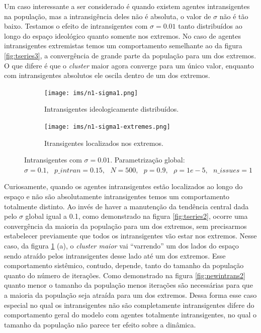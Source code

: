   Um caso interessante a ser considerado é quando existem agentes intransigentes
  na população, mas a intransigência deles não é absoluta, o valor de \(\sigma\) não
  é tão baixo. Testamos o efeito de intransigentes com \(\sigma = 0.01\) tanto
  distribuídos ao longo do espaço ideológico quanto somente nos extremos. No
  caso de agentes intransigentes extremistas temos um comportamento semelhante
  ao da figura \ref{fig:tseries3}, a convergência de grande parte da população
  para um dos extremos. O que difere é que o \textit{cluster} maior agora
  converge para um único valor, enquanto com intransigentes absolutos ele oscila
  dentro de um dos extremos.

    \begin{figure}[H]
    \centering
    \begin{subfigure}[b]{0.49\textwidth}
      \texttt{[image: ims/n1-sigma1.png]}
      \caption{Intransigentes ideologicamente distribuídos.}
    \end{subfigure}
    \begin{subfigure}[b]{0.49\textwidth}
      \texttt{[image: ims/n1-sigma1-extremes.png]}
       \caption{Itransigentes localizados nos extremos.}
     \end{subfigure}

     \caption{ Intransigentes com \(\sigma = 0.01\). Parametrização global: \( \sigma =
       0.1, \text{ } p\_intran = 0.15, \text{ } N = 500, \text{ } p = 0.9,
       \text{ } \rho = 1e-5, \text{ } n\_issues = 1 \)}
    \label{fig:newintrans}
     \end{figure}
  
     Curiosamente, quando os agentes intransigentes estão localizados ao longo
     do espaço e não são absolutamente intransigentes temos um comportamento
     totalmente distinto. Ao invés de haver a manutenção da tendência central
     dada pelo \(\sigma\) global igual a 0.1, como demonstrado na figura
     \ref{fig:tseries2}, ocorre uma convergência da maioria da população para um
     dos extremos, sem precisarmos estabelecer previamente que todos os
     intransigentes vão estar nos extremos. Nesse caso, da figura
     \ref{fig:newintrans} (a), o \textit{cluster maior} vai ``varrendo'' um dos
     lados do espaço sendo atraído pelos intransigentes desse lado até um dos
     extremos. Esse comportamento sistêmico, contudo, depende, tanto do tamanho
     da população quanto do número de iterações.  Como demonstrado na figura
     \ref{fig:newintrans2} quanto menor o tamanho da população menos iterações
     são necessárias para que a maioria da população seja atraída para um dos
     extremos. Dessa forma esse caso especial no qual os intransigentes não são
     completamente intransigentes difere do comportamento geral do modelo com
     agentes totalmente intransigentes, no qual o tamanho da população não
     parece ter efeito sobre a dinâmica.
     
